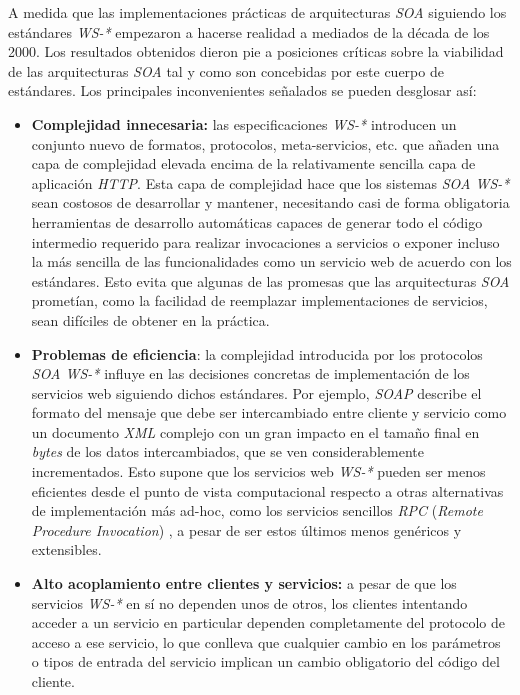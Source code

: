A medida que las implementaciones pr\'acticas de arquitecturas \textit{SOA} siguiendo los est\'andares \textit{WS-*} empezaron a hacerse realidad a mediados de la d\'ecada de los 2000. Los resultados obtenidos dieron pie a posiciones cr\'iticas sobre la viabilidad de las arquitecturas \textit{SOA} tal y como son concebidas por este cuerpo de est\'andares. Los principales inconvenientes se\~nalados se pueden desglosar as\'i:

\begin{itemize}

\item \textbf{Complejidad innecesaria:} las especificaciones \textit{WS-*} introducen un conjunto nuevo de formatos, protocolos, meta-servicios, etc. que  a\~naden una capa de complejidad elevada encima de la relativamente sencilla capa de aplicaci\'on \textit{HTTP}. Esta capa de complejidad hace que los sistemas \textit{SOA WS-*} sean costosos de desarrollar y mantener, necesitando casi de forma obligatoria herramientas de desarrollo autom\'aticas capaces de generar todo el c\'odigo intermedio requerido para realizar invocaciones a servicios o exponer incluso la m\'as sencilla de las funcionalidades como un servicio web de acuerdo con los est\'andares. Esto evita que algunas de las promesas que las arquitecturas \textit{SOA} promet\'ian, como la facilidad de reemplazar implementaciones de servicios, sean dif\'iciles de obtener en la pr\'actica. 

\item \textbf{Problemas de eficiencia}: la complejidad introducida por los protocolos \textit{SOA WS-*} influye en las decisiones concretas de implementaci\'on de los servicios web siguiendo dichos est\'andares. Por ejemplo, \textit{SOAP} describe el formato del mensaje que debe ser intercambiado entre cliente y servicio como un documento \textit{XML} complejo con un gran impacto en el tama\~no final en \textit{bytes} de los datos intercambiados, que se ven considerablemente incrementados. Esto supone que los servicios web \textit{WS-*} pueden ser menos eficientes desde el punto de vista computacional respecto a otras alternativas de implementaci\'on m\'as ad-hoc, como los servicios sencillos \textit{RPC} (\textit{Remote Procedure Invocation}) \cite{xmlrpc}, a pesar de ser estos \'ultimos menos gen\'ericos y extensibles.

\item \textbf{Alto acoplamiento entre clientes y servicios:} a pesar de que los servicios \textit{WS-*} en s\'i no dependen unos de otros, los clientes intentando acceder a un servicio en particular dependen completamente del protocolo de acceso a ese servicio, lo que conlleva que  cualquier cambio en los par\'ametros o tipos de entrada del servicio implican un cambio obligatorio del c\'odigo del cliente.

\end{itemize}

